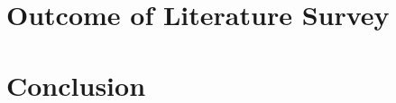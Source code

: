 \documentclass{IEEEtran}
\begin{document}
  \section{Outcome of Literature Survey}

  \section{Conclusion}

  
  
\end{document}
